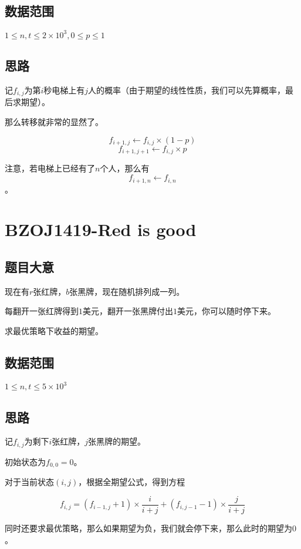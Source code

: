 \documentclass{ctexart}
\numberwithin{equation}{section}
\begin{document}
\begin{flushleft}
  \subsection{数据范围}
  $1\le n,t \le 2\times 10^3, 0\le p\le 1$
  \subsection{思路}
  
  记$f_{i,j}$为第$i$秒电梯上有$j$人的概率（由于期望的线性性质，我们可以先算概率，最后求期望）。

  那么转移就非常的显然了。

  $$f_{i+1,j} \leftarrow f_{i,j}\times (1-p)$$
  $$f_{i+1,j+1} \leftarrow f_{i,j}\times p$$

  注意，若电梯上已经有了$n$个人，那么有$$f_{i+1,n}\leftarrow f_{i,n}$$。
  \newpage

  \section{BZOJ1419-Red is good}
  \subsection{题目大意}
  现在有$r$张红牌，$b$张黑牌，现在随机排列成一列。

  每翻开一张红牌得到$1$美元，翻开一张黑牌付出$1$美元，你可以随时停下来。

  求最优策略下收益的期望。
  

  \subsection{数据范围}
  $1\le n,t \le 5\times 10^3$
  \subsection{思路}
  
  记$f_{i,j}$为剩下$i$张红牌，$j$张黑牌的期望。

  初始状态为$f_{0,0} = 0$。

  对于当前状态$(i,j)$，根据全期望公式，得到方程

  $$f_{i,j}=(f_{i-1,j}+1)\times \frac{i}{i+j}+(f_{i,j-1}-1)\times \frac{j}{i+j}$$

  同时还要求最优策略，那么如果期望为负，我们就会停下来，那么此时的期望为$0$。


\end{flushleft}
\end{document}
